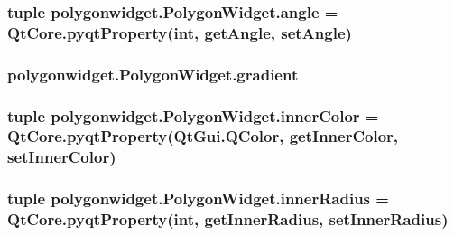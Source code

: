 \subsubsection[{angle}]{\setlength{\rightskip}{0pt plus 5cm}tuple polygonwidget.\+Polygon\+Widget.\+angle = Qt\+Core.\+pyqt\+Property(int, {\bf get\+Angle}, {\bf set\+Angle})\hspace{0.3cm}{\ttfamily [static]}}\label{classpolygonwidget_1_1PolygonWidget_a206923722d26f72966534621bd580588}
\hypertarget{classpolygonwidget_1_1PolygonWidget_a220ff294c9b4e82057894e6351a20bbf}{}
\subsubsection[{gradient}]{\setlength{\rightskip}{0pt plus 5cm}polygonwidget.\+Polygon\+Widget.\+gradient}\label{classpolygonwidget_1_1PolygonWidget_a220ff294c9b4e82057894e6351a20bbf}
\hypertarget{classpolygonwidget_1_1PolygonWidget_ad318837da432d0f8688d788260f96dcf}{}
\subsubsection[{inner\+Color}]{\setlength{\rightskip}{0pt plus 5cm}tuple polygonwidget.\+Polygon\+Widget.\+inner\+Color = Qt\+Core.\+pyqt\+Property(Qt\+Gui.\+Q\+Color, {\bf get\+Inner\+Color}, {\bf set\+Inner\+Color})\hspace{0.3cm}{\ttfamily [static]}}\label{classpolygonwidget_1_1PolygonWidget_ad318837da432d0f8688d788260f96dcf}
\hypertarget{classpolygonwidget_1_1PolygonWidget_a2ac6b478484e96f7afbb816c733bfd60}{}
\subsubsection[{inner\+Radius}]{\setlength{\rightskip}{0pt plus 5cm}tuple polygonwidget.\+Polygon\+Widget.\+inner\+Radius = Qt\+Core.\+pyqt\+Property(int, {\bf get\+Inner\+Radius}, {\bf set\+Inner\+Radius})\hspace{0.3cm}{\ttfamily [static]}}\label{classpolygonwidget_1_1PolygonWidget_a2ac6b478484e96f7afbb816c733bfd60}
\hypertarget{classpolygonwidget_1_1PolygonWidget_ace03a3ab04a542407e305e669ac04bc0}{}
